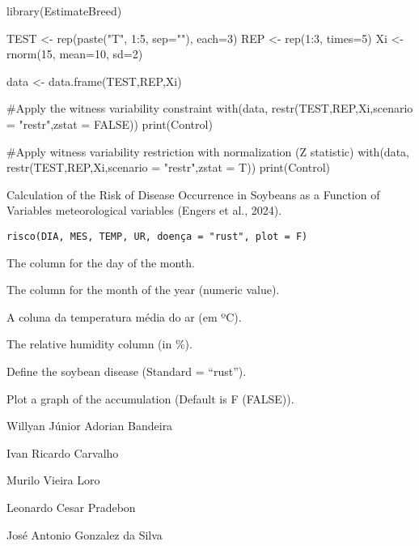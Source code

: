 \documentclass[a4paper]{book}
\begin{document}
\begin{Examples}
\begin{ExampleCode}

library(EstimateBreed)

TEST <- rep(paste("T", 1:5, sep=""), each=3)
REP <- rep(1:3, times=5)
Xi <- rnorm(15, mean=10, sd=2)

data <- data.frame(TEST,REP,Xi)

#Apply the witness variability constraint
with(data, restr(TEST,REP,Xi,scenario = "restr",zstat = FALSE))
print(Control)

#Apply witness variability restriction with normalization (Z statistic)
with(data, restr(TEST,REP,Xi,scenario = "restr",zstat = T))
print(Control)

\end{ExampleCode}
\end{Examples}
%
\begin{Description}
Calculation of the Risk of Disease Occurrence in Soybeans as a Function of
Variables meteorological variables (Engers et al., 2024).
\end{Description}
%
\begin{Usage}
\begin{verbatim}
risco(DIA, MES, TEMP, UR, doença = "rust", plot = F)
\end{verbatim}
\end{Usage}
%
\begin{Arguments}
\begin{ldescription}
\item[\code{DIA}] The column for the day of the month.

\item[\code{MES}] The column for the month of the year (numeric value).

\item[\code{TEMP}] A coluna da temperatura média do ar (em ºC).

\item[\code{UR}] The relative humidity column (in \%).

\item[\code{doença}] Define the soybean disease (Standard = “rust”).

\item[\code{plot}] Plot a graph of the accumulation (Default is F (FALSE)).
\end{ldescription}
\end{Arguments}
%
\begin{Author}
Willyan Júnior Adorian Bandeira

Ivan Ricardo Carvalho

Murilo Vieira Loro

Leonardo Cesar Pradebon

José Antonio Gonzalez da Silva
\end{Author}
\end{document}
